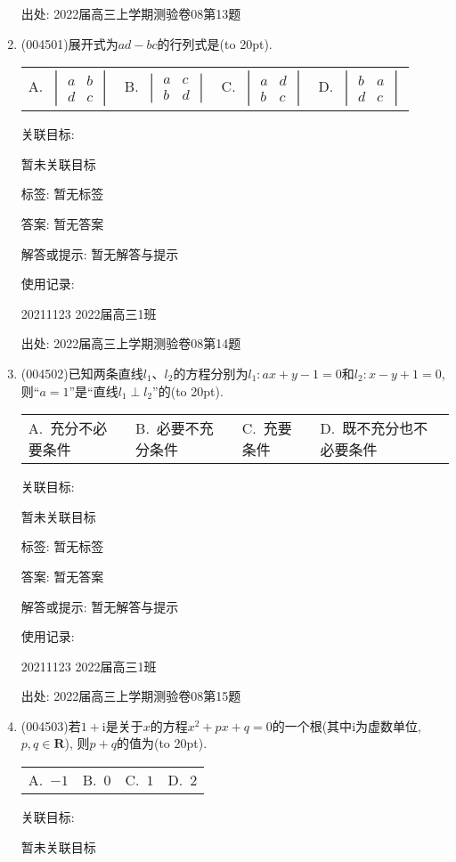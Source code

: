 \documentclass[10pt,a4paper]{article}
\newcommand{\bracket}[1]{(\hbox to #1pt{})}
\newcommand{\fourch}[4]{\par\begin{tabular}{p{.23\textwidth}p{.23\textwidth}p{.23\textwidth}p{.23\textwidth}}
A.~#1 &B.~#2& C.~#3& D.~#4
\end{tabular}}
\begin{document}
\begin{enumerate}[1.]
出处: 2022届高三上学期测验卷08第13题
\item { (004501)}展开式为$ad-bc$的行列式是\bracket{20}.
\fourch{$\begin{vmatrix}a & b  \\ d & c  \end{vmatrix}$}{$\begin{vmatrix} a & c  \\ b & d  \end{vmatrix}$}{$\begin{vmatrix}
  a & d  \\ b & c  \end{vmatrix}$}{$\begin{vmatrix}   b & a  \\ d & c  \end{vmatrix}$}


关联目标:

暂未关联目标



标签: 暂无标签

答案: 暂无答案

解答或提示: 暂无解答与提示

使用记录:

20211123	2022届高三1班	


出处: 2022届高三上学期测验卷08第14题
\item { (004502)}已知两条直线$l_1$、$l_2$的方程分别为$l_1:ax+y-1=0$和$l_2:x-y+1=0$, 则``$a=1$''是``直线$l_1\perp l_2$''的\bracket{20}.
\fourch{充分不必要条件}{必要不充分条件}{充要条件}{既不充分也不必要条件}


关联目标:

暂未关联目标



标签: 暂无标签

答案: 暂无答案

解答或提示: 暂无解答与提示

使用记录:

20211123	2022届高三1班	


出处: 2022届高三上学期测验卷08第15题
\item { (004503)}若$1+\mathrm{i}$是关于$x$的方程$x^2+px+q=0$的一个根(其中$\mathrm{i}$为虚数单位, $p,q\in \mathbf{R}$), 则$p+q$的值为\bracket{20}.
\fourch{$-1$}{$0$}{$1$}{$2$}


关联目标:

暂未关联目标




\end{enumerate}
\end{document}
